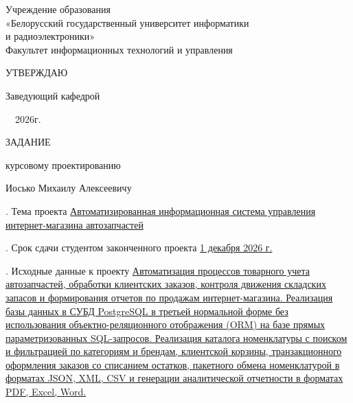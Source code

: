 
\setcounter{page}{2}
\sloppy
\thispagestyle{empty}

\begin{center}
Учреждение образования\\
«Белорусский государственный университет информатики\\
и радиоэлектроники»\\[0.5em]
Факультет информационных технологий и управления
\end{center}

\medskip

\hfill\begin{minipage}{\widthof{Заведующий кафедрой}}


  УТВЕРЖДАЮ

  Заведующий кафедрой


  \underline{\hphantom{хорошая дата }}\ \  2026г.

\end{minipage}
\medskip

\begin{center}
  \noindent
  ЗАДАНИЕ

   курсовому проектированию

  \bigskip
   Иосько Михаилу Алексеевичу
\end{center}

. Тема проекта \uline{Автоматизированная информационная система управления интернет-магазина автозапчастей}

\smallskip
{}. Срок сдачи студентом законченного проекта \uline{\hfill 1 декабря 2026 г. \hfill}

\smallskip
{}. Исходные данные к проекту \uline{Автоматизация процессов товарного учета автозапчастей, обработки клиентских заказов, контроля движения складских запасов и формирования отчетов по продажам интернет-магазина. Реализация базы данных в СУБД PostgreSQL в третьей нормальной форме без использования объектно-реляционного отображения (ORM) на базе прямых параметризованных SQL-запросов. Реализация каталога номенклатуры с поиском и фильтрацией по категориям и брендам, клиентской корзины, транзакционного оформления заказов со списанием остатков, пакетного обмена номенклатурой в форматах JSON, XML, CSV и генерации аналитической отчетности в форматах PDF, Excel, Word.}

